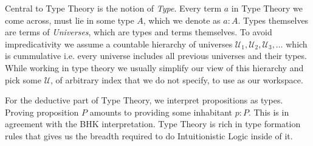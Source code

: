 \documentclass[12pt]{report}
\theoremstyle{definition}
\begin{document}
Central to Type Theory is the notion of \textit{Type}. Every term $a$ in Type Theory we come across, must lie in some type $A$, which we denote as $a : A$. 
Types themselves are terms of \textit{Universes}, which are types and terms themselves. 
To avoid impredicativity we assume a countable hierarchy of universes $\mathcal{U}_1,\mathcal{U}_2,\mathcal{U}_3,\ldots$ which is cummulative i.e. every universe includes all previous universes and their types. 
While working in type theory we usually simplify our view of this hierarchy and pick some $\mathcal{U}$, of arbitrary index that we do not specify, to use as our workspace. 

For the deductive part of Type Theory, we interpret propositions as types. 
Proving proposition $P$ amounts to providing some inhabitant $p : P$. 
This is in agreement with the BHK interpretation. 
Type Theory is rich in type formation rules that gives us the breadth required to do Intuitionistic Logic inside of it. 
\end{document}
